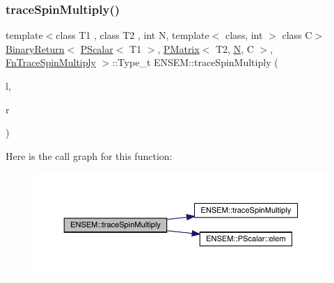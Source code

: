 \subsubsection{\texorpdfstring{traceSpinMultiply()}{traceSpinMultiply()}\hspace{0.1cm}{\footnotesize\ttfamily [3/3]}}
{\footnotesize\ttfamily template$<$class T1 , class T2 , int N, template$<$ class, int $>$ class C$>$ \\
\mbox{\hyperlink{structENSEM_1_1BinaryReturn}{Binary\+Return}}$<$ \mbox{\hyperlink{classENSEM_1_1PScalar}{P\+Scalar}}$<$ T1 $>$, \mbox{\hyperlink{classENSEM_1_1PMatrix}{P\+Matrix}}$<$ T2, \mbox{\hyperlink{operator__name__util_8cc_a7722c8ecbb62d99aee7ce68b1752f337}{N}}, C $>$, \mbox{\hyperlink{structENSEM_1_1FnTraceSpinMultiply}{Fn\+Trace\+Spin\+Multiply}} $>$\+::Type\+\_\+t E\+N\+S\+E\+M\+::trace\+Spin\+Multiply (\begin{DoxyParamCaption}\item[{const \mbox{\hyperlink{classENSEM_1_1PScalar}{P\+Scalar}}$<$ T1 $>$ \&}]{l,  }\item[{const \mbox{\hyperlink{classENSEM_1_1PMatrix}{P\+Matrix}}$<$ T2, \mbox{\hyperlink{operator__name__util_8cc_a7722c8ecbb62d99aee7ce68b1752f337}{N}}, C $>$ \&}]{r }\end{DoxyParamCaption})\hspace{0.3cm}{\ttfamily [inline]}}

Here is the call graph for this function\+:\nopagebreak
\begin{figure}[H]
\begin{center}
\leavevmode
\includegraphics[width=350pt]{df/d0a/group__primmatrix_gafb9febbc048f38bb6e1dc7d60d8dde8d_cgraph}
\end{center}
\end{figure}
\mbox{\label{group__primmatrix_gaffe281aeb23abb6d655321654f855e26}} 

